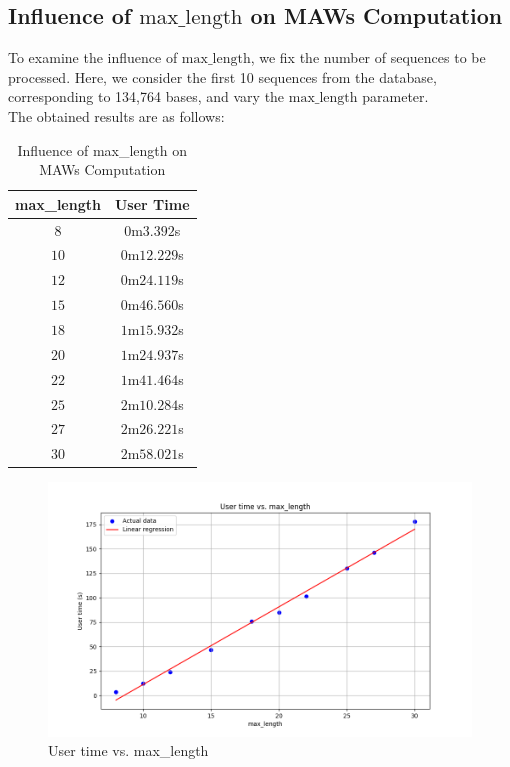 \documentclass[conference]{IEEEtran}
\begin{document}
\subsection{Influence of $\text{max\_length}$ on MAWs Computation}
To examine the influence of $\text{max\_length}$, we fix the number of sequences to be processed. Here, we consider the first 10 sequences from the database, corresponding to 134,764 bases, and vary the $\text{max\_length}$ parameter.\\
The obtained results are as follows:\\
\begin{table}[htbp]
\caption{Influence of max\_length on MAWs Computation}
\begin{center}
\begin{tabular}{|c|c|}
\hline
\textbf{max\_length} & \textbf{User Time} \\
\hline
$8$ & $0$m$3.392$s\\
\hline
$10$ & $0$m$12.229$s\\
\hline
$12$ & $0$m$24.119$s\\
\hline
$15$ & $0$m$46.560$s\\
\hline
$18$ & $1$m$15.932$s\\
\hline
$20$ & $1$m$24.937$s\\
\hline
$22$ & $1$m$41.464$s\\
\hline
$25$ & $2$m$10.284$s\\
\hline
$27$ & $2$m$26.221$s\\
\hline
$30$ & $2$m$58.021$s\\
\hline
\end{tabular}
\end{center}
\end{table}

\begin{figure}[htbp]
\centerline{\includegraphics[scale=0.35]{user time vs max_length.png}}
\caption{User time vs. max\_length}
\label{fig}
\end{figure}
\end{document}
